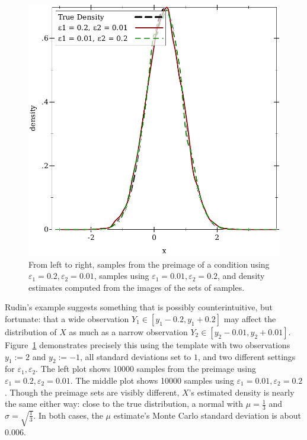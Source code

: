 \begin{figure}[tb!]
\includegraphics[width=\subfigurewidth]{figures/normal-normals-density}%
\caption[Inference with $\varepsilon_i$ of differing magnitudes]{From left to right, samples from the preimage of a condition using $\varepsilon_1 = 0.2,\varepsilon_2 = 0.01$, samples using $\varepsilon_1 = 0.01,\varepsilon_2 = 0.2$, and density estimates computed from the images of the sets of samples.}%
\label{fig:normal-normals}
\end{figure}

Rudin's example suggests something that is possibly counterintuitive, but fortunate: that a wide observation $\mathit{Y_1} \in [y_1-0.2,y_1+0.2]$ may affect the distribution of $\mathit{X}$ as much as a narrow observation $\mathit{Y_2} \in [y_2-0.01,y_2+0.01]$.
Figure~\ref{fig:normal-normals} demonstrates precisely this using the  template with two observations $y_1 := 2$ and $y_2 := -1$, all standard deviations set to $1$, and two different settings for $\varepsilon_1,\varepsilon_2$.
The left plot shows 10000 samples from the preimage using $\varepsilon_1 = 0.2,\varepsilon_2 = 0.01$.
The middle plot shows 10000 samples using $\varepsilon_1 = 0.01,\varepsilon_2 = 0.2$.
Though the preimage sets are visibly different, $\mathit{X}$'s estimated density is nearly the same either way: close to the true distribution, a normal with $\mu = \frac{1}{3}$ and $\sigma = \sqrt{\frac{1}{3}}$.
In both cases, the $\mu$ estimate's Monte Carlo standard deviation is about $0.006$.

